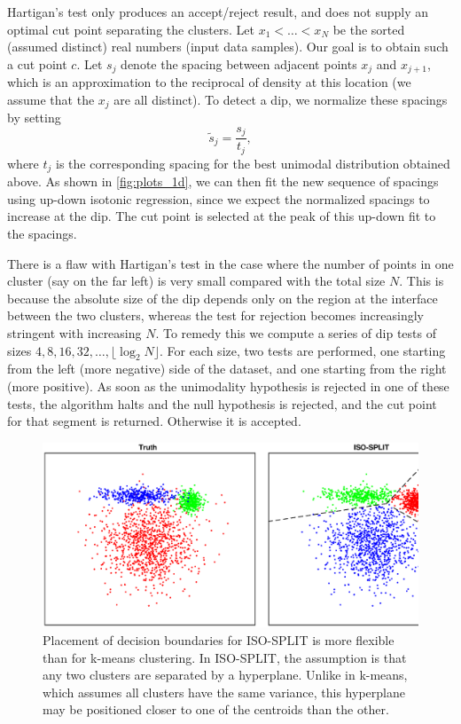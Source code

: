 \documentclass[10pt]{article}
\begin{document}
Hartigan's test only produces an accept/reject result, and does not supply an optimal cut point separating the clusters. Let $x_1<\dots<x_N$ be the sorted (assumed distinct) real numbers (input data samples). Our goal is to obtain such a cut point $c$. Let $s_j$ denote the spacing between adjacent points $x_j$ and $x_{j+1}$, which is an approximation to the reciprocal of density at this location (we assume that the $x_j$ are all distinct). To detect a dip, we normalize these spacings by setting 
$$\tilde{s}_j=\frac{s_j}{t_j},$$
where $t_j$ is the corresponding spacing for the best unimodal distribution obtained above. As shown in \ref{fig:plots_1d}, we can then fit the new sequence of spacings using up-down isotonic regression, since we expect the normalized spacings to increase at the dip. The cut point is selected at the peak of this up-down fit to the spacings. 

There is a flaw with Hartigan's test in the case where the number of points in one cluster (say on the far left) is very small compared with the total size $N$. This is because the absolute size of the dip depends only on the region at the interface between the two clusters, whereas the test for rejection becomes increasingly stringent with increasing $N$. To remedy this we compute a series of dip tests of sizes $4,8,16,32,\dots,\lfloor\log_2 N\rfloor$. For each size, two tests are performed, one starting from the left (more negative) side of the dataset, and one starting from the right (more positive). As soon as the unimodality hypothesis is rejected in one of these tests, the algorithm halts and the null hypothesis is rejected, and the cut point for that segment is returned. Otherwise it is accepted.

\begin{figure}
\begin{center}
\includegraphics[width=5.5in]{images/decision_boundaries.eps}
\end{center}
\caption{
Placement of decision boundaries for ISO-SPLIT is more flexible than for k-means clustering. In ISO-SPLIT, the assumption is that any two clusters are separated by a hyperplane. Unlike in k-means, which assumes all clusters have the same variance, this hyperplane may be positioned closer to one of the centroids than the other.
}
\label{fig:decision_boundaries}
\end{figure}
\end{document}
